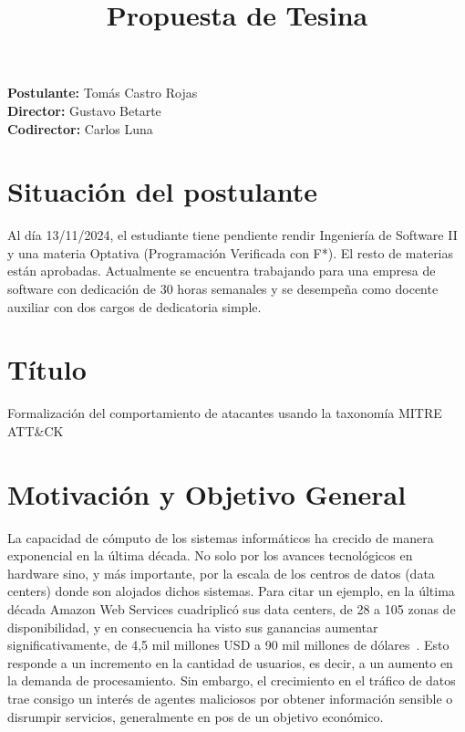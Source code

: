 \documentclass[a4paper,12pt]{article}
\title{Propuesta de Tesina}
\begin{document}
\maketitle

\begin{flushleft}
\textbf{Postulante:} Tomás Castro Rojas \\
\textbf{Director:} Gustavo Betarte\\
\textbf{Codirector:} Carlos Luna\\
\end{flushleft}

\section{Situación del postulante}
Al día 13/11/2024, el estudiante tiene pendiente rendir Ingeniería de Software II y una materia Optativa (Programación Verificada con F*). El resto de materias están aprobadas. Actualmente se encuentra trabajando para una empresa de software con dedicación de 30 horas semanales y se desempeña como docente auxiliar con dos cargos de dedicatoria simple. 

\section{Título}

Formalización del comportamiento de atacantes usando la taxonomía MITRE ATT\&CK

\section{Motivación y Objetivo General}
La capacidad de cómputo de los sistemas informáticos ha crecido de manera exponencial en la última década. No solo por los avances tecnológicos en hardware sino, y más importante, por la escala de los centros de datos (data centers) donde son alojados dichos sistemas. Para citar un ejemplo, en la última década Amazon Web Services cuadriplicó sus data centers, de 28 a 105 zonas de disponibilidad, y en consecuencia ha visto sus ganancias aumentar significativamente, de 4,5 mil millones USD a 90 mil millones de dólares~\cite{1,2,3}. Esto responde a un incremento en la cantidad de usuarios, es decir, a un aumento en la demanda de procesamiento. Sin embargo, el crecimiento en el tráfico de datos trae consigo un interés de agentes maliciosos por obtener información sensible o disrumpir servicios, generalmente en pos de un objetivo económico.
\end{document}
